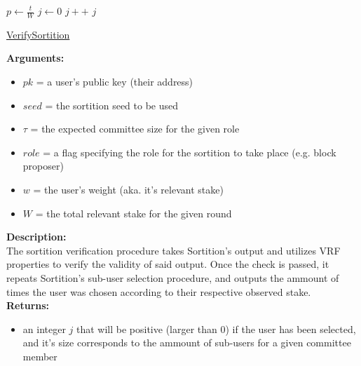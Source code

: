 \documentclass[10pt,a4paper]{article}
\begin{document}
\begin{algorithm}
    \begin{algorithmic}[H]
        \State $p \gets \frac{t}{W}$
        \State $j \gets 0$
        \While{$\frac{hash}{2^{hashlen}} \notin [\sum_{k=0}^jB(k;w,p), \sum_{k=0}^{j+1}B(k;w,p))$}
            \State $j++$
        \EndWhile
        \Return $j$
    \EndFunction
    \end{algorithmic}
    \caption{\underline{VerifySortition}}
\end{algorithm}

\noindent \textbf{Arguments:}
\begin{itemize}
    \item $pk$ = a user's public key (their address)
    \item $seed$ = the sortition seed to be used
    \item $\tau$ = the expected committee size for the given role
    \item $role$ = a flag specifying the role for the sortition to take place (e.g. block proposer)
    \item $w$ = the user's weight (aka. it's relevant stake)
    \item $W$ = the total relevant stake for the given round
  \end{itemize}

\noindent \textbf{Description:}\\
The sortition verification procedure takes Sortition's output and utilizes VRF properties to verify the validity of said output.
Once the check is passed, it repeats Sortition's sub-user selection procedure, and outputs the ammount of times the user was chosen
according to their respective observed stake.\\

\noindent \textbf{Returns:}
\begin{itemize}
    \item an integer $j$ that will be positive (larger than 0) if the user has been selected, and it's size corresponds to the ammount
    of sub-users for a given committee member
  \end{itemize}
\end{document}
